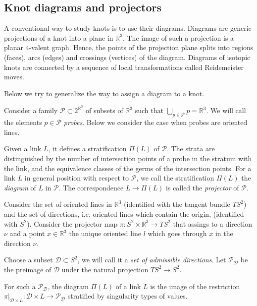 \documentclass{article}
\theoremstyle{definition}
\theoremstyle{remark}
\def\R{{\mathbb R}}
\begin{document}
\subsection{Knot diagrams and projectors}\label{subsect:projectors}


A conventional way to study knots is to use their diagrams. Diagrams are generic projections of a knot into a plane in $\R^3$. The image of such a projection is a planar $4$-valent graph. Hence, the points of the projection plane splits into regions (faces), arcs (edges) and crossings (vertices) of the diagram. Diagrams of isotopic knots are connected by a sequence of local transformations called Reidemeister moves.

Below we try to %
generalize the way to assign a diagram to a knot.

Consider a family $\mathcal P\subset 2^{\R^3}$ of subsets of $\R^3$ such that $\bigcup_{p\in\mathcal P} p=\R^3$. We will call the elements $p\in\mathcal P$ \emph{probes}. Below we consider the case when probes are oriented lines.

Given a link $L$, it defines a stratification $\Pi(L)$ of $\mathcal P$. The strata are distinguished by the number of intersection points of a probe in the stratum with the link, and the equivalence classes of the germs of the intersection points. For a link $L$ in general position with respect to $\mathcal P$, we call the stratification $\Pi(L)$ the \emph{diagram} of $L$ in $\mathcal P$. The correspondence $L\mapsto\Pi(L)$ is called the \emph{projector} of $\mathcal P$.


Consider the set of oriented lines in $\R^3$ (identified with the tangent bundle $TS^2$) and the set of directions, i.e. oriented lines which contain the origin, (identified with $S^2$). Consider the projector map $\pi\colon S^2\times\R^3\to TS^2$ that assings to a direction $\nu$ and a point $x\in\R^3$ the unique oriented line $l$ which goes through $x$ in the direction $\nu$.

Choose a subset $\mathcal D\subset S^2$, we will call it a \emph{set of admissible directions}. Let $\mathcal P_{\mathcal D}$ be the preimage of $\mathcal D$ under the natural projection $TS^2\to S^2$.

For such a $\mathcal P_{\mathcal D}$, the diagram $\Pi(L)$ of a link $L$ is the image of the restriction $\pi|_{\mathcal D\times L}\colon \mathcal D\times L\to\mathcal P_{\mathcal D}$ stratified by singularity types of values.
\end{document}
